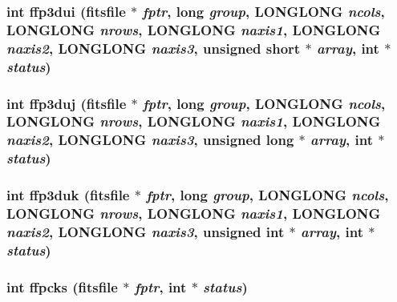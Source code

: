 \subsubsection{\setlength{\rightskip}{0pt plus 5cm}int ffp3dui (\bf{fitsfile} $\ast$ {\em fptr}, long {\em group}, \bf{LONGLONG} {\em ncols}, \bf{LONGLONG} {\em nrows}, \bf{LONGLONG} {\em naxis1}, \bf{LONGLONG} {\em naxis2}, \bf{LONGLONG} {\em naxis3}, unsigned short $\ast$ {\em array}, int $\ast$ {\em status})}\label{test_2roimasker_2fitsio_8h_1dd3e0662151506b0470d7348493663d}


\subsubsection{\setlength{\rightskip}{0pt plus 5cm}int ffp3duj (\bf{fitsfile} $\ast$ {\em fptr}, long {\em group}, \bf{LONGLONG} {\em ncols}, \bf{LONGLONG} {\em nrows}, \bf{LONGLONG} {\em naxis1}, \bf{LONGLONG} {\em naxis2}, \bf{LONGLONG} {\em naxis3}, unsigned long $\ast$ {\em array}, int $\ast$ {\em status})}\label{test_2roimasker_2fitsio_8h_1e610ca12d1921d2b12d1f51184ec1fb}


\subsubsection{\setlength{\rightskip}{0pt plus 5cm}int ffp3duk (\bf{fitsfile} $\ast$ {\em fptr}, long {\em group}, \bf{LONGLONG} {\em ncols}, \bf{LONGLONG} {\em nrows}, \bf{LONGLONG} {\em naxis1}, \bf{LONGLONG} {\em naxis2}, \bf{LONGLONG} {\em naxis3}, unsigned int $\ast$ {\em array}, int $\ast$ {\em status})}\label{test_2roimasker_2fitsio_8h_245d5b7ef5c4c394dbc0c7f3f55a5857}


\subsubsection{\setlength{\rightskip}{0pt plus 5cm}int ffpcks (\bf{fitsfile} $\ast$ {\em fptr}, int $\ast$ {\em status})}\label{test_2roimasker_2fitsio_8h_1063ed09b8a73de4a574e6c4a49c1d72}


